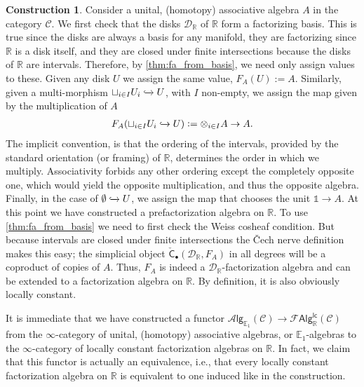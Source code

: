 \documentclass[12pt,a4paper]{article}
\newcounter{counter} \numberwithin{counter}{section}
\theoremstyle{definition}
\newtheorem{construction}[counter]{Construction}
\theoremstyle{plain}
\theoremstyle{remark}
\newcommand{\catC}{\mathscr{C}}
\newcommand{\lcfa}{\mathscr{F} \mathsf{Alg}^{\mathsf{lc}}}
\newcommand{\alg}[1]{\mathscr{A} \mathsf{lg}_{#1}}
\newcommand{\cech}{\check{\mathsf{C}}}
\begin{document}
\begin{construction}\label{con:lcfas_on_R}
    Consider a unital, (homotopy) associative algebra $A$ in the category $\catC$. We first check that the disks $\mathscr{D}_{\mathbb{R}}$ of $\mathbb{R}$ form a factorizing basis. This is true since the disks are always a basis for any manifold, they are factorizing since $\mathbb{R}$ is a disk itself, and they are closed under finite intersections because the disks of $\mathbb{R}$ are intervals. Therefore, by \cref{thm:fa_from_basis}, we need only assign values to these. Given any disk $U$ we assign the same value, $F_A(U) := A$. Similarly, given a multi-morphism $\sqcup_{i \in I} U_i \xhookrightarrow{} U$, with $I$ non-empty, we assign the map given by the multiplication of $A$
    \begin{align}
        F_A(\sqcup_{i \in I} U_i \xhookrightarrow{} U) := \otimes_{i \in I} A \rightarrow A.
    \end{align}
    The implicit convention, is that the ordering of the intervals, provided by the standard orientation (or framing) of $\mathbb{R}$, determines the order in which we multiply. Associativity forbids any other ordering except the completely opposite one, which would yield the opposite multiplication, and thus the opposite algebra. Finally, in the case of $\emptyset \xhookrightarrow{} U$, we assign the map that chooses the unit $\mathbb{1} \rightarrow A$. At this point we have constructed a prefactorization algebra on $\mathbb{R}$. To use \cref{thm:fa_from_basis} we need to first check the Weiss cosheaf condition. But because intervals are closed under finite intersections the \v{C}ech nerve definition makes this easy; the simplicial object $\cech_{\bullet}(\mathscr{D}_{\mathbb{R}}, F_A)$ in all degrees will be a coproduct of copies of $A$. Thus, $F_A$ is indeed a $\mathscr{D}_{\mathbb{R}}$-factorization algebra and can be extended to a factorization algebra on $\mathbb{R}$. By definition, it is also obviously locally constant.

    It is immediate that we have constructed a functor $\alg{\mathbb{E}_1}(\catC) \rightarrow \lcfa_{\mathbb{R}} (\catC)$ from the $\infty$-category of unital, (homotopy) associative algebras, or $\mathbb{E}_1$-algebras to the $\infty$-category of locally constant factorization algebras on $\mathbb{R}$. In fact, we claim that this functor is actually an equivalence, i.e., that every locally constant factorization algebra on $\mathbb{R}$ is equivalent to one induced like in the construction.
\end{construction}
\end{document}

